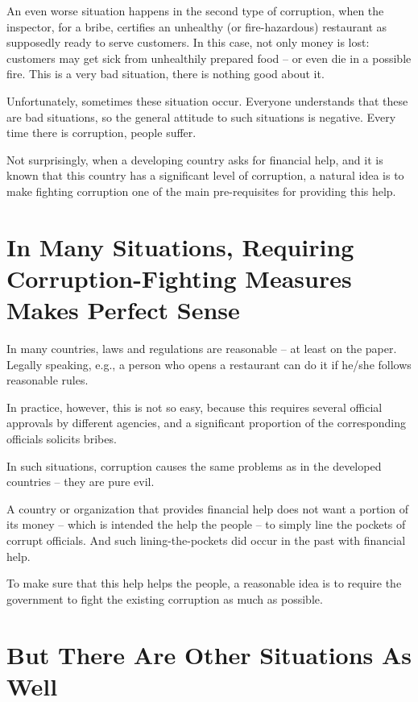 \documentclass{article}
\begin{document}
An even worse situation happens in the second type of corruption, when the inspector, for a bribe, certifies an unhealthy (or fire-hazardous) restaurant as supposedly ready to serve customers. In this case, not only money is lost: customers may get sick from unhealthily prepared food -- or even die in a possible fire. This is a very bad situation, there is nothing good about it.
\medskip

 Unfortunately, sometimes these situation occur. Everyone understands that these are bad situations, so the general attitude to such situations is negative. Every time there is corruption, people suffer.

Not surprisingly, when a developing country asks for financial help, and it is known that this country has a significant level of corruption, a natural idea is to make fighting corruption one of the main pre-requisites for providing this help.

\section{In Many Situations, Requiring Corruption-Fighting Measures Makes Perfect Sense}

 In many countries, laws and regulations are reasonable -- at least on the paper. Legally speaking, e.g., a person who opens a restaurant can do it if he/she follows reasonable rules.

In practice, however, this is not so easy, because this requires several official approvals by different agencies, and a significant proportion of the corresponding officials solicits bribes.
\medskip

 In such situations, corruption causes the same problems as in the developed countries -- they are pure evil.

A country or organization that provides financial help does not want a portion of its money -- which is intended the help the people -- to simply line the pockets of corrupt officials. And such lining-the-pockets did occur in the past with financial help.

To make sure that this help helps the people, a reasonable idea is to require the government to fight the existing corruption as much as possible.

\section{But There Are Other Situations As Well}
\end{document}
